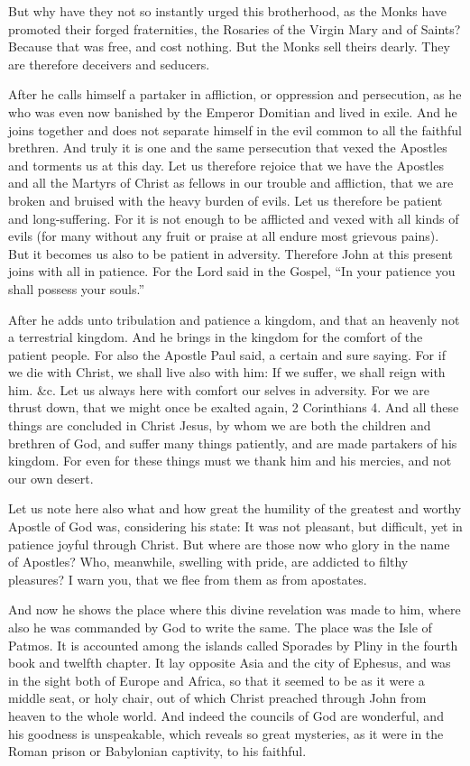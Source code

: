But why have they not so instantly urged this brotherhood, as the Monks have promoted their forged fraternities, the Rosaries of the Virgin Mary and of Saints? Because that was free, and cost nothing. But the Monks sell theirs dearly. They are therefore deceivers and seducers.

After he calls himself a partaker in affliction, or oppression and persecution, as he who was even now banished by the Emperor Domitian and lived in exile. And he joins together and does not separate himself in the evil common to all the faithful brethren. And truly it is one and the same persecution that vexed the Apostles and torments us at this day. Let us therefore rejoice that we have the Apostles and all the Martyrs of Christ as fellows in our trouble and affliction, that we are broken and bruised with the heavy burden of evils. Let us therefore be patient and long-suffering. For it is not enough to be afflicted and vexed with all kinds of evils (for many without any fruit or praise at all endure most grievous pains). But it becomes us also to be patient in adversity. Therefore John at this present joins with all in patience. For the Lord said in the Gospel, “In your patience you shall possess your souls.”

After he adds unto tribulation and patience a kingdom, and that an heavenly not a terrestrial kingdom. And he brings in the kingdom for the comfort of the patient people. For also the Apostle Paul said, a certain and sure saying. For if we die with Christ, we shall live also with him: If we suffer, we shall reign with him. \&c. Let us always here with comfort our selves in adversity. For we are thrust down, that we might once be exalted again, 2 Corinthians 4. And all these things are concluded in Christ Jesus, by whom we are both the children and brethren of God, and suffer many things patiently, and are made partakers of his kingdom. For even for these things must we thank him and his mercies, and not our own desert.

Let us note here also what and how great the humility of the greatest and worthy Apostle of God was, considering his state: It was not pleasant, but difficult, yet in patience joyful through Christ. But where are those now who glory in the name of Apostles? Who, meanwhile, swelling with pride, are addicted to filthy pleasures? I warn you, that we flee from them as from apostates.

And now he shows the place where this divine revelation was made to him, where also he was commanded by God to write the same. The place was the Isle of Patmos. It is accounted among the islands called Sporades by Pliny in the fourth book and twelfth chapter. It lay opposite Asia and the city of Ephesus, and was in the sight both of Europe and Africa, so that it seemed to be as it were a middle seat, or holy chair, out of which Christ preached through John from heaven to the whole world. And indeed the councils of God are wonderful, and his goodness is unspeakable, which reveals so great mysteries, as it were in the Roman prison or Babylonian captivity, to his faithful.

